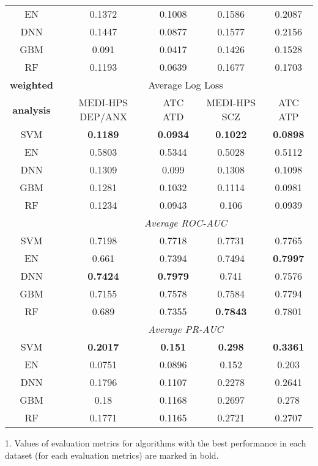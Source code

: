 \begin{table}[htbp]
\begin{threeparttable}
\begin{tabular}{c|cccc}
          EN    & 0.1372 & 0.1008 & 0.1586 & 0.2087 \\
          DNN   & 0.1447 & 0.0877 & 0.1577 & 0.2156 \\
          GBM   & 0.091 & 0.0417 & 0.1426 & 0.1528 \\
          RF    & 0.1193 & 0.0639 & 0.1677 & 0.1703 \\
          \midrule
          \textbf{weighted} & \multicolumn{4}{c}{Average Log Loss} \\
          \textbf{ analysis} & MEDI-HPS DEP/ANX & ATC ATD  & MEDI-HPS SCZ  & ATC ATP  \\
          \midrule
          SVM   & \textbf{0.1189} & \textbf{0.0934} & \textbf{0.1022} & \textbf{0.0898} \\
          EN    & 0.5803 & 0.5344 & 0.5028 & 0.5112 \\
          DNN   & 0.1309 & 0.099 & 0.1308 & 0.1098 \\
          GBM   & 0.1281 & 0.1032 & 0.1114 & 0.0981 \\
          RF    & 0.1234 & 0.0943 & 0.106 & 0.0939 \\
                & \multicolumn{4}{c}{\textit{Average ROC-AUC}} \\
          SVM   & 0.7198 & 0.7718 & 0.7731 & 0.7765 \\
          EN    & 0.661 & 0.7394 & 0.7494 & \textbf{0.7997} \\
          DNN   & \textbf{0.7424} & \textbf{0.7979} & 0.741 & 0.7576 \\
          GBM   & 0.7155 & 0.7578 & 0.7584 & 0.7794 \\
          RF    & 0.689 & 0.7355 & \textbf{0.7843} & 0.7801 \\
                & \multicolumn{4}{c}{\textit{Average PR-AUC}} \\
          SVM   & \textbf{0.2017} & \textbf{0.151} & \textbf{0.298} & \textbf{0.3361} \\
          EN    & 0.0751 & 0.0896 & 0.152 & 0.203 \\
          DNN   & 0.1796 & 0.1107 & 0.2278 & 0.2641 \\
          GBM   & 0.18  & 0.1168 & 0.2697 & 0.278 \\
          RF    & 0.1771 & 0.1165 & 0.2721 & 0.2707 \\
          \bottomrule
          \end{tabular}%
          \begin{tablenotes}
            \small
            \item 1. Values of evaluation metrics for algorithms with the best performance in each dataset (for each evaluation metrics) are marked in bold. 

\end{tablenotes}
\end{threeparttable}
\end{table}

